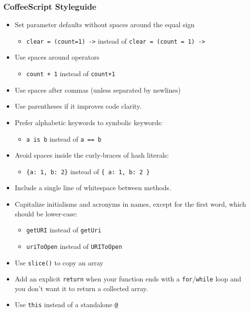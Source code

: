 \hypertarget{coffeescript-styleguide}{%
\subsubsection{CoffeeScript Styleguide}\label{coffeescript-styleguide}}

\begin{itemize}
\tightlist
\item
  Set parameter defaults without spaces around the equal sign

  \begin{itemize}
  \tightlist
  \item
    \texttt{clear\ =\ (count=1)\ -\textgreater{}} instead of
    \texttt{clear\ =\ (count\ =\ 1)\ -\textgreater{}}
  \end{itemize}
\item
  Use spaces around operators

  \begin{itemize}
  \tightlist
  \item
    \texttt{count\ +\ 1} instead of \texttt{count+1}
  \end{itemize}
\item
  Use spaces after commas (unless separated by newlines)
\item
  Use parentheses if it improves code clarity.
\item
  Prefer alphabetic keywords to symbolic keywords:

  \begin{itemize}
  \tightlist
  \item
    \texttt{a\ is\ b} instead of \texttt{a\ ==\ b}
  \end{itemize}
\item
  Avoid spaces inside the curly-braces of hash literals:

  \begin{itemize}
  \tightlist
  \item
    \texttt{\{a:\ 1,\ b:\ 2\}} instead of \texttt{\{\ a:\ 1,\ b:\ 2\ \}}
  \end{itemize}
\item
  Include a single line of whitespace between methods.
\item
  Capitalize initialisms and acronyms in names, except for the first
  word, which should be lower-case:

  \begin{itemize}
  \tightlist
  \item
    \texttt{getURI} instead of \texttt{getUri}
  \item
    \texttt{uriToOpen} instead of \texttt{URIToOpen}
  \end{itemize}
\item
  Use \texttt{slice()} to copy an array
\item
  Add an explicit \texttt{return} when your function ends with a
  \texttt{for}/\texttt{while} loop and you don't want it to return a
  collected array.
\item
  Use \texttt{this} instead of a standalone \texttt{@}


\end{itemize}
